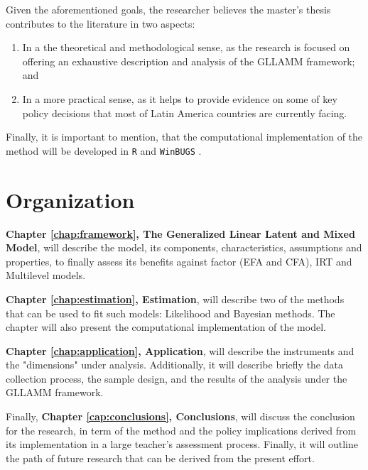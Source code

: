 \noindent Given the aforementioned goals, the researcher believes the master's thesis contributes to the literature in two aspects: 

\begin{enumerate}
	\item In a the theoretical and methodological sense, as the research is focused on offering an exhaustive description and analysis of the GLLAMM framework; and 
	
	\item In a more practical sense, as it helps to provide evidence on some of key policy decisions that most of Latin America countries are currently facing.
\end{enumerate}

\noindent Finally, it is important to mention, that the computational implementation of the method will be developed in {\color{red} \texttt{R}} \citep{R2015} and {\color{red}\texttt{WinBUGS}} \citep{Lunn_et_al_2000}.



\section{Organization}

\textbf{Chapter \ref{chap:framework}, The Generalized Linear Latent and Mixed Model}, will describe the model, its components, characteristics, assumptions and properties, to finally assess its benefits against factor (EFA and CFA), IRT and Multilevel models.

\textbf{Chapter \ref{chap:estimation}, Estimation}, will describe {\color{red} two} of the methods that can be used to fit such models: {\color{red} Likelihood and Bayesian methods}. The chapter will also present the computational implementation of the model.

\textbf{Chapter \ref{chap:application}, Application}, will describe the instruments and the "dimensions" under analysis. Additionally, it will describe briefly the data collection process, the sample design, and the results of the analysis under the GLLAMM framework.

Finally, \textbf{Chapter \ref{cap:conclusions}, Conclusions}, will discuss the conclusion for the research, in term of the method and the policy implications derived from its implementation in a large teacher's assessment process. Finally, it will outline the path of future research that can be derived from the present effort.